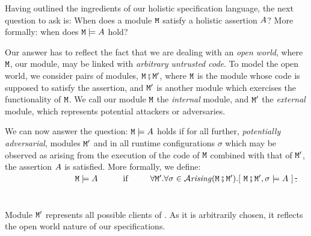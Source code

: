 
Having outlined the ingredients of our holistic specification
language, the next question to ask is: When does a module ${\mbox{\tt{\ensuremath{{\mbox{\tt{M}}}}}}}$ satisfy
a holistic assertion $A$?  More formally: when does
${\mbox{\tt{\ensuremath{{\mbox{\tt{M}}}}}}} \models A$ 
hold? 
  
Our answer has to reflect the fact that we are dealing with an  
\emph{open  world},  where  ${\mbox{\tt{\ensuremath{{\mbox{\tt{M}}}}}}}$, our module, may be
linked with \textit{arbitrary untrusted code}.
%
%
%
%
To %
 model the open world, we consider
 pairs of modules, 
${\mbox{\tt{\ensuremath{{\mbox{\tt{M}}}}}}} \fatsemi {{\mbox{\tt{\ensuremath{{\mbox{\tt{M}}}}}}}'}$,  where ${\mbox{\tt{\ensuremath{{\mbox{\tt{M}}}}}}}$ is the module 
whose code is supposed to satisfy the assertion,
and ${\mbox{\tt{\ensuremath{{\mbox{\tt{M}}}}}}}'$  is  another %
 module which exercises
the functionality of ${\mbox{\tt{\ensuremath{{\mbox{\tt{M}}}}}}}$. We call our module ${\mbox{\tt{\ensuremath{{\mbox{\tt{M}}}}}}}$ the {\em internal} module, and
 ${\mbox{\tt{\ensuremath{{\mbox{\tt{M}}}}}}}'$ the {\em external} module, which represents potential
 attackers or adversaries.
     
We can now answer the question: ${\mbox{\tt{\ensuremath{{\mbox{\tt{M}}}}}}} \models A$ 
 holds if for all further, {\em potentially adversarial}, modules ${\mbox{\tt{\ensuremath{{\mbox{\tt{M}}}}}}}'$ and in  all runtime configurations $\sigma$ which may be observed as arising from the  execution of the code of ${\mbox{\tt{\ensuremath{{\mbox{\tt{M}}}}}}}$ combined with that of ${\mbox{\tt{\ensuremath{{\mbox{\tt{M}}}}}}}'$, the assertion $A$ is satisfied. More formally, we define:\\
\sout{$~ \strut  \hspace{1.1in} \M \models \A \ \ \  \ \ \ \ \ \mbox{
if               } \ \ \  \ \ \  \  \forall \M'.\forall \sigma\in\Arising
{\M \mkpair  {\M'}}. [\ \M \mkpair  {\M'},\sigma \models \A\ ]$.} \\
\\
 \\
Module ${\mbox{\tt{\ensuremath{{\mbox{\tt{M}}}}}}}'$ represents all possible clients of {\M}.  As it is arbitrarily chosen, it reflects the open world nature of our specifications.%

